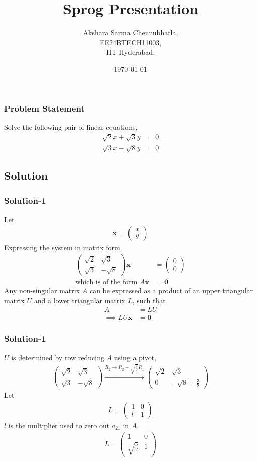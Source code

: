 \documentclass{beamer}
\title{Sprog Presentation}
\author{Akshara Sarma Chennubhatla,\\ EE24BTECH11003,\\IIT Hyderabad.\\}
\date{\today}
\theoremstyle{remark}
\newcommand{\myvec}[1]{\ensuremath{\begin{pmatrix}#1\end{pmatrix}}}
\let\vec\mathbf
\numberwithin{equation}{section}
\begin{document}
		\begin{frame}
			\titlepage
		\end{frame}

		\begin{frame}
			\frametitle{Problem Statement}
Solve the following pair of linear equations,
\begin{align}
	\sqrt{2}x + \sqrt{3}y &= 0\\
	\sqrt{3}x - \sqrt{8}y &= 0
\end{align}
\end{frame}
\subsection{Solution}
\begin{frame}
      \frametitle{Solution-1}
	Let
\begin{align}
	\vec{x} = \myvec{x\\y}
\end{align}
Expressing the system in matrix form,
\begin{align}
	\myvec{\sqrt{2} & \sqrt{3} \\ \sqrt{3} & -\sqrt{8}}\vec{x} &= \myvec{0 \\ 0}\\
	\text{which is of the form } A\vec{x} &= \vec{0}
\end{align}
Any non-singular matrix $A$ can be expressed as a product of an upper triangular matrix $U$ and a lower triangular matrix $L$, such that
\begin{align}
	A &= LU\\
	\implies LU\vec{x} &= \vec{0}
\end{align}

\end{frame}
\begin{frame}
	\frametitle{Solution-1}
	$U$ is determined by row reducing $A$ using a pivot,
\begin{align}
	\myvec{\sqrt{2} & \sqrt{3}\\\sqrt{3} & -\sqrt{8}} \xrightarrow {R_2 \to R_2 - \sqrt{\frac{3}{2}}R_1} \myvec{\sqrt{2} & \sqrt{3}\\0 & -\sqrt{8} - \frac{3}{2}}
\end{align}
Let 
\begin{align}
	L = \myvec{1 & 0\\l & 1}
\end{align}
$l$ is the multiplier used to zero out $a_{21}$ in $A$.
\begin{align}
	L = \myvec{1 & 0 \\ \sqrt{\frac{3}{2}} & 1}
\end{align}
\end{frame}
\end{document}
